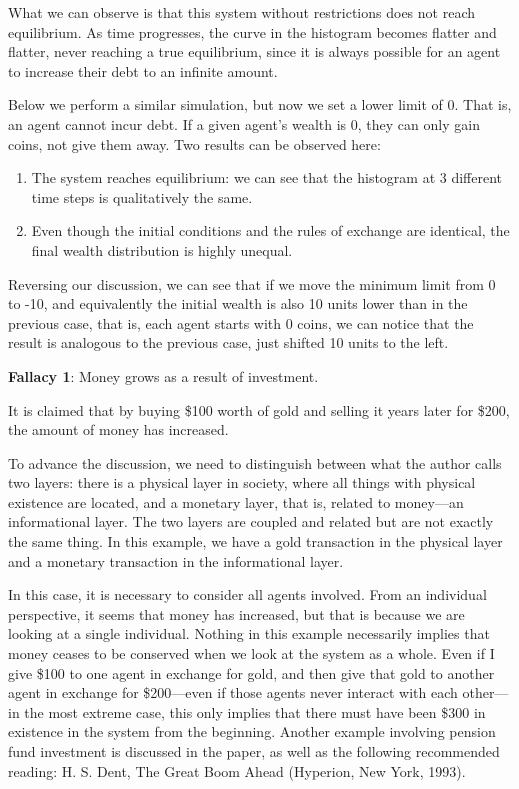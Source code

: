 What we can observe is that this system without restrictions does not reach equilibrium. As time progresses, the curve in the histogram becomes flatter and flatter, never reaching a true equilibrium, since it is always possible for an agent to increase their debt to an infinite amount.

 Below we perform a similar simulation, but now we set a lower limit of 0. That is, an agent cannot incur debt. If a given agent's wealth is 0, they can only gain coins, not give them away. Two results can be observed here:

\begin{enumerate}
    \item The system reaches equilibrium: we can see that the histogram at 3 different time steps is qualitatively the same.
    \item Even though the initial conditions and the rules of exchange are identical, the final wealth distribution is highly unequal.
\end{enumerate}

 Reversing our discussion, we can see that if we move the minimum limit from 0 to -10, and equivalently the initial wealth is also 10 units lower than in the previous case, that is, each agent starts with 0 coins, we can notice that the result is analogous to the previous case, just shifted 10 units to the left. 

 \textbf{Fallacy 1}: Money grows as a result of investment.

It is claimed that by buying \$100 worth of gold and selling it years later for \$200, the amount of money has increased.

To advance the discussion, we need to distinguish between what the author calls two layers: there is a physical layer in society, where all things with physical existence are located, and a monetary layer, that is, related to money—an informational layer. The two layers are coupled and related but are not exactly the same thing. In this example, we have a gold transaction in the physical layer and a monetary transaction in the informational layer.

In this case, it is necessary to consider all agents involved. From an individual perspective, it seems that money has increased, but that is because we are looking at a single individual. Nothing in this example necessarily implies that money ceases to be conserved when we look at the system as a whole. Even if I give \$100 to one agent in exchange for gold, and then give that gold to another agent in exchange for \$200—even if those agents never interact with each other—in the most extreme case, this only implies that there must have been \$300 in existence in the system from the beginning. Another example involving pension fund investment is discussed in the paper, as well as the following recommended reading: H. S. Dent, The Great Boom Ahead (Hyperion, New York, 1993).

